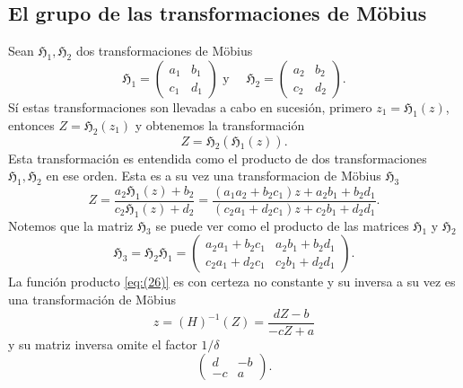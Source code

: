 \documentclass{matematicasud}
\begin{document}
\subsection{El grupo de las transformaciones de Möbius}\label{cap:3.2}
Sean $\mathfrak{H}_1,\mathfrak{H}_2$ dos transformaciones de Möbius
\begin{equation*}
    \mathfrak{H}_1=
    \begin{pmatrix}
        a_1 & b_1\\
        c_1 & d_1
    \end{pmatrix}
    \text { y } 
    \quad
    \mathfrak{H}_2=
    \begin{pmatrix}
        a_2 & b_2\\
        c_2 & d_2
    \end{pmatrix}.
\end{equation*}
Sí estas transformaciones son llevadas a cabo en sucesión, primero $z_1=\mathfrak{H}_1(z)$, entonces $Z=\mathfrak{H}_2(z_1)$ y obtenemos la transformación
\begin{equation}
    Z=\mathfrak{H}_2(\mathfrak{H}_1(z)).
    \label{eq:(26)}
\end{equation}
Esta transformación es entendida como el producto de dos transformaciones $\mathfrak{H}_1,\mathfrak{H}_2$ en ese orden. Esta es a su vez una transformacion de Möbius $\mathfrak{H}_3$
\begin{equation*}
    Z=\frac{a_2\mathfrak{H}_1(z)+b_2}{c_2\mathfrak{H}_1(z)+d_2}=\frac{(a_1a_2+b_2c_1)z+a_2b_1+b_2d_1}{(c_2a_1+d_2c_1)z+c_2b_1+d_2d_1}.
\end{equation*}
Notemos que la matriz $\mathfrak{H}_3$ se puede ver como el producto de las matrices $\mathfrak{H}_1$ y $\mathfrak{H}_2$
\begin{equation}
    \mathfrak{H}_3=\mathfrak{H}_2\mathfrak{H}_1=
    \begin{pmatrix}
        a_2a_1+b_2c_1 & a_2b_1+b_2d_1\\
        c_2a_1+d_2c_1 & c_2b_1+d_2d_1
    \end{pmatrix}.
    \label{eq:(27)}
\end{equation}
La función producto \eqref{eq:(26)} es con certeza no constante y su inversa a su vez es una transformación de Möbius
\begin{equation}
    z=(H)^{-1}(Z)=\frac{dZ-b}{-cZ+a}
    \label{eq:(28)}
\end{equation}
y su matriz inversa omite el factor $1/\delta$
\begin{equation*}
    \begin{pmatrix}
        d & -b\\
        -c & a
    \end{pmatrix}.
\end{equation*}
\end{document}
